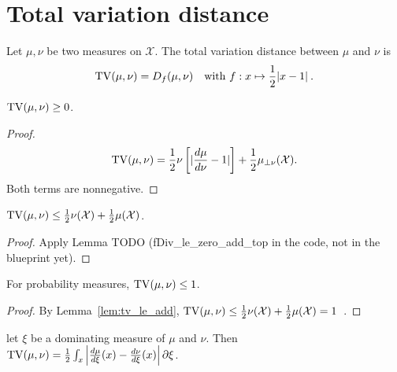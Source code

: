 \chapter{Total variation distance}

\begin{definition}[TV distance]
  \label{def:TV}
  \leanok
  Let $\mu, \nu$ be two measures on $\mathcal X$. The total variation distance between $\mu$ and $\nu$ is
  \begin{align*}
  \operatorname{TV}(\mu, \nu) = D_f(\mu, \nu) \quad \text{with } f: x \mapsto \frac{1}{2}\vert x - 1 \vert \: .
  \end{align*}
\end{definition}

\begin{lemma}
  \label{lem:tv_nonneg}
  $\operatorname{TV}(\mu, \nu) \ge 0$.
\end{lemma}

\begin{proof}
\begin{align*}
\operatorname{TV}(\mu, \nu)
= \frac{1}{2}\nu\left[ \vert \frac{d\mu}{d\nu} - 1 \vert \right] + \frac{1}{2}\mu_{\perp \nu}(\mathcal X).
\end{align*}
Both terms are nonnegative.
\end{proof}

\begin{lemma}
  \label{lem:tv_le_add}
  $\operatorname{TV}(\mu, \nu) \le \frac{1}{2}\nu(\mathcal X) + \frac{1}{2}\mu(\mathcal X)$.
\end{lemma}

\begin{proof}
Apply Lemma TODO (fDiv\_le\_zero\_add\_top in the code, not in the blueprint yet).
\end{proof}


\begin{lemma}
  \label{lem:tv_le_one}
  For probability measures,
  $\operatorname{TV}(\mu, \nu) \le 1$.
\end{lemma}

\begin{proof}
By Lemma~\ref{lem:tv_le_add}, $\operatorname{TV}(\mu, \nu) \le \frac{1}{2}\nu(\mathcal X) + \frac{1}{2}\mu(\mathcal X) = 1$~.
\end{proof}

\begin{lemma}
  \label{lem:tv_eq_integral_abs}
  let $\xi$ be a dominating measure of $\mu$ and $\nu$. Then
  $\operatorname{TV}(\mu, \nu) = \frac{1}{2}\int_x \left\vert \frac{d\mu}{d\xi}(x) - \frac{d\nu}{d\xi}(x) \right\vert \partial\xi$.
\end{lemma}

